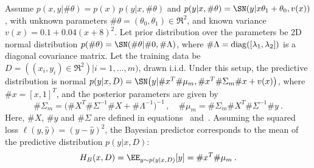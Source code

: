 %
%

\begin{example}
\label{example:BLregression}Assume $p(x,y|\#\theta)=p(x)\,p(y|x,\#\theta)$
and $p(y|x,\#\theta)=\SN(y|x\theta_1+\theta_0,v(x))$, with unknown parameters $\#\theta=(\theta_0,\theta_1)\in\Re^2$, and known variance $v(x)=0.1+0.04(x+8)^2$. Let prior distribution over the parameters be 2D normal distribution $p(\#\theta)=\SN(\#\theta|\#0,\#\Lambda)$, where $\#\Lambda={\rm diag}([\lambda_1,\lambda_2])$ is a diagonal covariance matrix. Let the training data be $D=((x_i,y_i)\in\Re^2)|i=1,\ldots,m)$, drawn i.i.d.  
%
Under this setup, the predictive distribution is normal $p(y|x,D)=\SN\big(y|\#x^T\#\mu_m,\#x^T\#\Sigma_m\#x+v(x)\big)$, where $\#x=[x,1]^T$, and the posterior parameters are given by
\[
\#\Sigma_m=\big(\#X^T\#\Sigma^{-1}\#X+\#\Lambda^{-1} )^{-1}\,,\quad \#\mu_m=\#\Sigma_m\#X^T\#\Sigma^{-1}\#y \:.
\]
Here, $\#X$, $\#y$ and $\#\Sigma$ are defined in equations~ and~.
Assuming the squared loss $\ell(y,\hat{y})=(y-\hat{y})^2$, the Bayesian predictor corresponds to the mean of the predictive distribution $p(y|x,D)$:
\begin{equation}
\label{equ:BLpredLinReg}
   H_B(x,D) = \EE_{y\sim p(y|x,D)}[y]=\#x^T\#\mu_m \:.
\end{equation}
\end{example}

